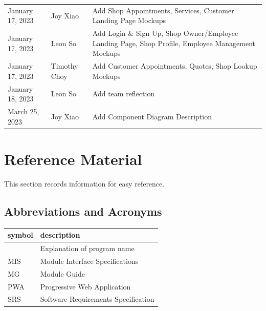 \documentclass[12pt, titlepage]{article}
\begin{document}
\begin{table}[hp]
\begin{tabularx}{\textwidth}{llX}
		January 17, 2023  & Joy Xiao              & Add Shop Appointments, Services, Customer Landing Page Mockups                                    \\
		January 17, 2023  & Leon So               & Add Login \& Sign Up, Shop Owner/Employee Landing Page, Shop Profile, Employee Management Mockups \\
		January 17, 2023  & Timothy Choy          & Add Customer Appointments, Quotes, Shop Lookup Mockups                                            \\
		January 18, 2023  & Leon So               & Add team reflection                                                                               \\
		March 25, 2023    & Joy Xiao              & Add Component Diagram Description                                                                 \\
		\bottomrule
	\end{tabularx}
\end{table}

\newpage

\section{Reference Material}

This section records information for easy reference.

\subsection{Abbreviations and Acronyms}

\begin{tabular}{l l}
	\toprule
	\textbf{symbol} & \textbf{description}                \\
	\midrule
	\progname       & Explanation of program name         \\
	MIS             & Module Interface Specifications     \\
	MG              & Module Guide                        \\
	PWA             & Progressive Web Application         \\
	SRS             & Software Requirements Specification \\
	\bottomrule
\end{tabular}

\newpage

\tableofcontents

\newpage
\end{document}
